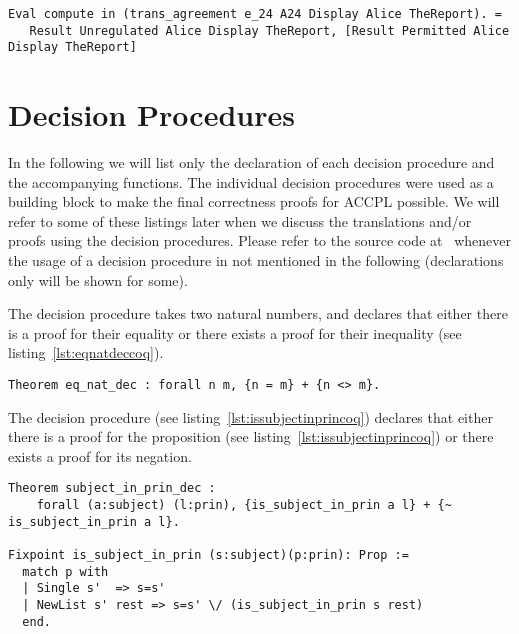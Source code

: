 \begin{minipage}[c]{0.95\textwidth}
\begin{lstlisting}
Eval compute in (trans_agreement e_24 A24 Display Alice TheReport). = 
   Result Unregulated Alice Display TheReport, [Result Permitted Alice Display TheReport]
\end{lstlisting}
\end{minipage} 






\section{Decision Procedures}\label{sec:decprocs}

In the following we will list only the declaration of each decision procedure and the accompanying functions. The individual decision procedures were used as a building block to make the final correctness proofs for \ac{ACCPL} possible. We will refer to some of these listings later when we discuss the translations and/or proofs using the decision procedures. Please refer to the source code at~\cite{BahmanSistany2015} whenever the usage of a decision procedure in not mentioned in the following (declarations only will be shown for some).

The decision procedure  takes two natural numbers, and declares that either there is a proof for their equality or there exists a proof for their inequality (see listing~\ref{lst:eqnatdeccoq}).

\begin{lstlisting}
Theorem eq_nat_dec : forall n m, {n = m} + {n <> m}.
\end{lstlisting}

The decision procedure  (see listing~\ref{lst:issubjectinprincoq}) declares that either there is a proof for the proposition  (see listing~\ref{lst:issubjectinprincoq}) or there exists a proof for its negation. 

\begin{lstlisting}
Theorem subject_in_prin_dec :
    forall (a:subject) (l:prin), {is_subject_in_prin a l} + {~ is_subject_in_prin a l}.

Fixpoint is_subject_in_prin (s:subject)(p:prin): Prop :=
  match p with
  | Single s'  => s=s'
  | NewList s' rest => s=s' \/ (is_subject_in_prin s rest)
  end.
\end{lstlisting}

